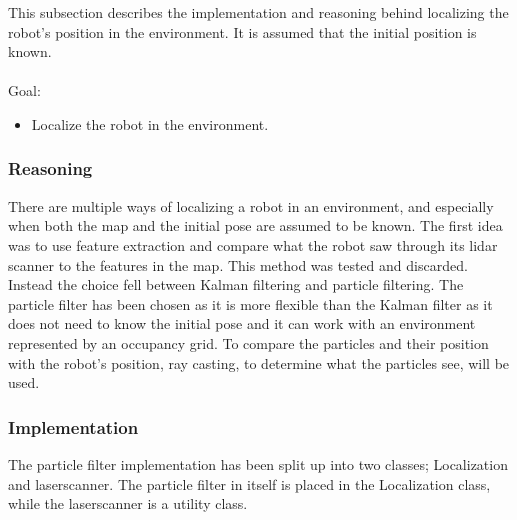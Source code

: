 \documentclass[../../../Main.tex]{subfiles}
\begin{document}
This subsection describes the implementation and reasoning behind localizing the robot's position in the environment. It is assumed that the initial position is known.\\
\\
Goal:
\begin{itemize}
  \item Localize the robot in the environment.
\end{itemize}

\subsubsection{Reasoning}
There are multiple ways of localizing a robot in an environment, and especially when both the map and the initial pose are assumed to be known. The first idea was to use feature extraction and compare what the robot saw through its lidar scanner to the features in the map. This method was tested and discarded. Instead the choice fell between Kalman filtering and particle filtering. The particle filter has been chosen as it is more flexible than the Kalman filter as it does not need to know the initial pose and it can work with an environment represented by an occupancy grid. To compare the particles and their position with the robot's position, ray casting, to determine what the particles see, will be used.

\subsubsection{Implementation}
The particle filter implementation has been split up into two classes; Localization and laserscanner. The particle filter in itself is placed in the Localization class, while the laserscanner is a utility class. \\
\end{document}
